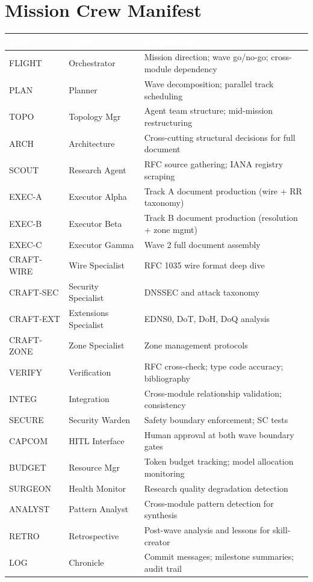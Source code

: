 \documentclass[11pt,letterpaper]{article}
\newcommand{\tableheader}[1]{\textbf{\sffamily\textcolor{white}{#1}}}
\begin{document}
\section{Mission Crew Manifest}

\begin{center}
\begin{tabularx}{\textwidth}{L{2.2cm}L{3cm}X}
\toprule
{}
\tableheader{Role} & \tableheader{Agent} & \tableheader{Responsibility} \\
\midrule
FLIGHT & Orchestrator & Mission direction; wave go/no-go; cross-module dependency \\
PLAN & Planner & Wave decomposition; parallel track scheduling \\
TOPO & Topology Mgr & Agent team structure; mid-mission restructuring \\
ARCH & Architecture & Cross-cutting structural decisions for full document \\
SCOUT & Research Agent & RFC source gathering; IANA registry scraping \\
EXEC-A & Executor Alpha & Track A document production (wire + RR taxonomy) \\
EXEC-B & Executor Beta & Track B document production (resolution + zone mgmt) \\
EXEC-C & Executor Gamma & Wave 2 full document assembly \\
CRAFT-WIRE & Wire Specialist & RFC 1035 wire format deep dive \\
CRAFT-SEC & Security Specialist & DNSSEC and attack taxonomy \\
CRAFT-EXT & Extensions Specialist & EDNS0, DoT, DoH, DoQ analysis \\
CRAFT-ZONE & Zone Specialist & Zone management protocols \\
VERIFY & Verification & RFC cross-check; type code accuracy; bibliography \\
INTEG & Integration & Cross-module relationship validation; consistency \\
SECURE & Security Warden & Safety boundary enforcement; SC tests \\
CAPCOM & HITL Interface & Human approval at both wave boundary gates \\
BUDGET & Resource Mgr & Token budget tracking; model allocation monitoring \\
SURGEON & Health Monitor & Research quality degradation detection \\
ANALYST & Pattern Analyst & Cross-module pattern detection for synthesis \\
RETRO & Retrospective & Post-wave analysis and lessons for skill-creator \\
LOG & Chronicle & Commit messages; milestone summaries; audit trail \\
\bottomrule
\end{tabularx}
\end{center}
\end{document}
